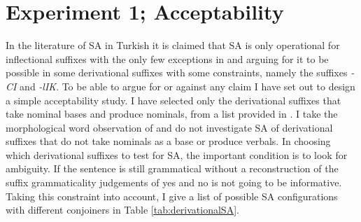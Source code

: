 \section{Experiment 1; Acceptability}

In the literature of SA in Turkish it is claimed that SA is only operational for inflectional suffixes \citep{orgun1995flat,kornfilt1996some,broadwell2008turkish, kornfilt2012revisiting} with the only few exceptions in \cite{kabak2007turkish} and \cite{akkucs2016suspended} arguing for it to be possible in some derivational suffixes with some constraints, namely the suffixes \textit{-CI} and \textit{-lIK}. To be able to argue for or against any claim I have set out to design a simple acceptability study. I have selected only the derivational suffixes that take nominal bases and produce nominals, from a list provided in \cite{goksel2004turkish}. I take the morphological word observation of \cite{kabak2007turkish} and do not investigate SA of derivational suffixes that do not take nominals as a base or produce verbals. In choosing which derivational suffixes to test for SA, the important condition is to look for ambiguity. If the sentence is still grammatical without a reconstruction of the suffix grammaticality judgements of yes and no is not going to be informative. Taking this constraint into account, I give a list of possible SA configurations with different conjoiners in Table \ref{tab:derivationalSA}.

